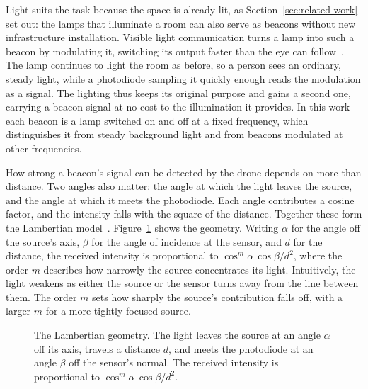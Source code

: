 Light suits the task because the space is already lit, as Section~\ref{sec:related-work} set out: the lamps that illuminate a room can also serve as beacons without new infrastructure installation. Visible light communication turns a lamp into such a beacon by modulating it, switching its output faster than the eye can follow~\cite{pathak2015vlc}. The lamp continues to light the room as before, so a person sees an ordinary, steady light, while a photodiode sampling it quickly enough reads the modulation as a signal. The lighting thus keeps its original purpose and gains a second one, carrying a beacon signal at no cost to the illumination it provides. In this work each beacon is a lamp switched on and off at a fixed frequency, which distinguishes it from steady background light and from beacons modulated at other frequencies.

How strong a beacon's signal can be detected by the drone depends on more than distance. Two angles also matter: the angle at which the light leaves the source, and the angle at which it meets the photodiode. Each angle contributes a cosine factor, and the intensity falls with the square of the distance. Together these form the Lambertian model~\cite{komine2004vlc}. Figure~\ref{fig:lambertian} shows the geometry. Writing $\alpha$ for the angle off the source's axis, $\beta$ for the angle of incidence at the sensor, and $d$ for the distance, the received intensity is proportional to $\cos^{m}\!\alpha \, \cos\beta / d^{2}$, where the order $m$ describes how narrowly the source concentrates its light. Intuitively, the light weakens as either the source or the sensor turns away from the line between them. The order $m$ sets how sharply the source's contribution falls off, with a larger $m$ for a more tightly focused source.

\begin{figure}[ht]
    \centering
    \caption{The Lambertian geometry. The light leaves the source at an angle $\alpha$ off its axis, travels a distance $d$, and meets the photodiode at an angle $\beta$ off the sensor's normal. The received intensity is proportional to $\cos^{m}\!\alpha\,\cos\beta/d^{2}$.}
    \label{fig:lambertian}
\end{figure}

